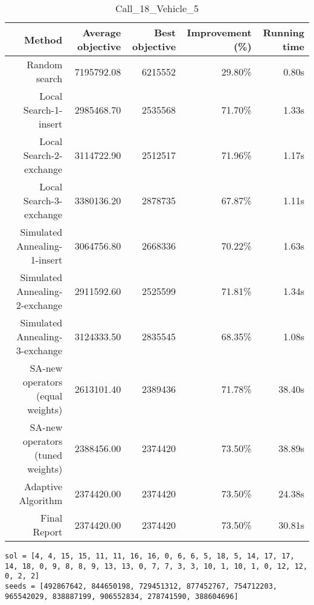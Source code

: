 \begin{table}[ht]
\centering
\caption{Call\_18\_Vehicle\_5}
\label{tab:call18vehicle5}
\begin{tabular}{|r|r|r|r|r|}
Method & Average objective & Best objective & Improvement (\%) & Running time \\
\hline
Random search & 7195792.08 & 6215552 & 29.80\% & 0.80s\\
Local Search-1-insert & 2985468.70 & 2535568 & 71.70\% & 1.33s\\
Local Search-2-exchange & 3114722.90 & 2512517 & 71.96\% & 1.17s\\
Local Search-3-exchange & 3380136.20 & 2878735 & 67.87\% & 1.11s\\
Simulated Annealing-1-insert & 3064756.80 & 2668336 & 70.22\% & 1.63s\\
Simulated Annealing-2-exchange & 2911592.60 & 2525599 & 71.81\% & 1.34s\\
Simulated Annealing-3-exchange & 3124333.50 & 2835545 & 68.35\% & 1.08s\\
SA-new operators (equal weights) & 2613101.40 & 2389436 & 71.78\% & 38.40s\\
SA-new operators (tuned weights) & 2388456.00 & 2374420 & 73.50\% & 38.89s\\
Adaptive Algorithm & 2374420.00 & 2374420 & 73.50\% & 24.38s\\
Final Report & 2374420.00 & 2374420 & 73.50\% & 30.81s\\
\end{tabular}%
\end{table}
\begin{lstlisting}[label={lst:call18vehicle5},caption=Optimal solution call\_18\_vehicle\_5]
sol = [4, 4, 15, 15, 11, 11, 16, 16, 0, 6, 6, 5, 18, 5, 14, 17, 17, 14, 18, 0, 9, 8, 8, 9, 13, 13, 0, 7, 7, 3, 3, 10, 1, 10, 1, 0, 12, 12, 0, 2, 2]
seeds = [492867642, 844650198, 729451312, 877452767, 754712203, 965542029, 838887199, 906552834, 278741590, 388604696]
\end{lstlisting}%
\clearpage


